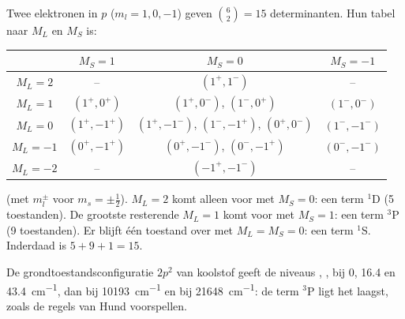 \begin{example}\label{ex:b3:many-electron-atoms:p2}
Twee elektronen in $p$ ($m_l = 1, 0, -1$) geven $\binom62 = 15$ determinanten.
Hun tabel naar $M_L$ en $M_S$ is:
\begin{center}\small
\begin{tabular}{c|ccc}
\hline
 & $M_S = 1$ & $M_S = 0$ & $M_S = -1$\\ \hline
$M_L = 2$ & -- & $(1^+,1^-)$ & --\\
$M_L = 1$ & $(1^+,0^+)$ & $(1^+,0^-)$, $(1^-,0^+)$ & $(1^-,0^-)$\\
$M_L = 0$ & $(1^+,-1^+)$ & $(1^+,-1^-)$, $(1^-,-1^+)$, $(0^+,0^-)$ & $(1^-,-1^-)$\\
$M_L = -1$ & $(0^+,-1^+)$ & $(0^+,-1^-)$, $(0^-,-1^+)$ & $(0^-,-1^-)$\\
$M_L = -2$ & -- & $(-1^+,-1^-)$ & --\\ \hline
\end{tabular}
\end{center}
(met $m_l^\pm$ voor $m_s = \pm\frac12$). $M_L = 2$ komt alleen voor met $M_S = 0$:
een term ${}^1$D (5 toestanden). De grootste resterende $M_L = 1$ komt voor met
$M_S = 1$: een term ${}^3$P (9 toestanden). Er blijft één toestand over met $M_L = M_S = 0$: een
term ${}^1$S. Inderdaad is $5 + 9 + 1 = 15$.
\end{example}

\begin{example}\label{ex:b3:many-electron-atoms:carbon}
De grondtoestandsconfiguratie $2p^2$ van koolstof geeft de niveaus ,
,  bij 0, 16.4 en \qty{43.4}{cm^{-1}}, dan
 bij \qty{10193}{cm^{-1}} en  bij
\qty{21648}{cm^{-1}}: de term ${}^3$P ligt het laagst, zoals de regels van
Hund voorspellen.
\end{example}

